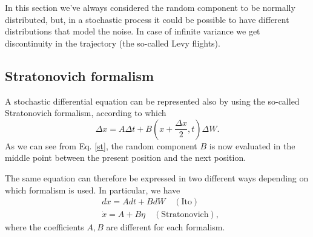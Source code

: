 In this section we've always considered the random component to be normally distributed, but, in a stochastic process it could be possible to have different distributions that model the noise. In case of infinite variance we get discontinuity in the trajectory (the so-called Levy flights).


\subsection{Stratonovich formalism}
A stochastic differential equation can be represented also by using the so-called Stratonovich formalism, according to which
\begin{equation}\label{st}
\Delta x=A\Delta t+B(x+\frac{\Delta x}{2},t)\Delta W.
\end{equation}
As we can see from Eq. \eqref{st}, the random component $B$ is now evaluated in the middle point between the present position and the next position.

The same equation can therefore be expressed in two different ways depending on which formalism is used. In particular, we have
 \begin{align}
        \nonumber &dx=Adt+BdW \quad (\text{Ito})\\
        \nonumber &\dot{x}=A+B\eta \quad (\text{Stratonovich}),
    \end{align}
 where the coefficients $A,B$ are different for each formalism.
 
 

